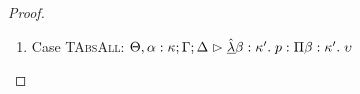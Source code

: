 \begin{proof}
\begin{enumerate}
  First, the syntax:
  \begin{tabbedproof}
    \oo By inversion, $\judgeA[\Theta, \alpha:\kappa, \beta:\kappa'; \Gamma; \Delta]{p}{\upsilon}$ \\
    \oo By induction, $\judgeA[\Theta, \beta:\kappa'; {[\tau/\alpha]}\Gamma; {[\tau/\alpha]}\Delta]{{[\tau/\alpha]}p}{{[\tau/\alpha]}\upsilon}$ \\
    \oo By rule, $\judgeA[\Theta; {[\tau/\alpha]}\Gamma; {[\tau/\alpha]}\Delta]{\pfun{\beta}{\kappa'}{{[\tau/\alpha]}p}}{\kappa' \To {[\tau/\alpha]}\upsilon}$ \\
    \oo By def of subst, $\judgeA[\Theta; {[\tau/\alpha]}\Gamma; {[\tau/\alpha]}\Delta]{{[\tau/\alpha]}(\pfun{\beta}{\kappa'}{p})}{{[\tau/\alpha]}(\kappa' \To \upsilon)}$ \\
  \end{tabbedproof}
  For semantics, consider $\interp{\judgeA[\Theta; {[\tau/\alpha]}\Gamma; {[\tau/\alpha]}\Delta]{{[\tau/\alpha]}(\pfun{\beta}{\kappa'}{p})}{{[\tau/\alpha]}(\kappa' \To \upsilon)}}\;\theta\;\gamma\;\delta$ \\
  \begin{eqnproof}
          {Semantics}
          {Induction}
          {Semantics}
  \end{eqnproof}
  The correctness of the application of $\gamma$ and $\delta$ follows from the equations for contexts
  under substitution. We also silently permuted the context at the second step, and made use of the fact
  that $\beta$ is not free in $\Gamma$, $\Delta$ or $\tau$.

\item Case \textsc{TAbsAll}: $\judgeA[\Theta, \alpha:\kappa; \Gamma; \Delta]{\pfunall{\beta}{\kappa'}{p}}{\forallsort{\beta}{\kappa'}{\upsilon}}$
  

\end{enumerate}
\end{proof}
